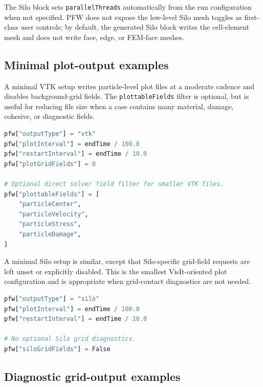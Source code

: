 The Silo block sets \texttt{parallelThreads} automatically from the run configuration when not specified.  PFW does not expose the low-level Silo mesh toggles as first-class user controls; by default, the generated Silo block writes the cell-element mesh and does not write face, edge, or FEM-face meshes.

\subsection{Minimal plot-output examples}
\label{sec:pfw-minimal-output-examples}

A minimal VTK setup writes particle-level plot files at a moderate cadence and disables background-grid fields.  The \texttt{plottableFields} filter is optional, but is useful for reducing file size when a case contains many material, damage, cohesive, or diagnostic fields.

\begin{lstlisting}[language=Python,caption={Minimal VTK/ParaView plot output.}]
pfw["outputType"] = "vtk"
pfw["plotInterval"] = endTime / 100.0
pfw["restartInterval"] = endTime / 10.0
pfw["plotGridFields"] = 0

# Optional direct solver field filter for smaller VTK files.
pfw["plottableFields"] = [
    "particleCenter",
    "particleVelocity",
    "particleStress",
    "particleDamage",
]
\end{lstlisting}

A minimal Silo setup is similar, except that Silo-specific grid-field requests are left unset or explicitly disabled.  This is the smallest VisIt-oriented plot configuration and is appropriate when grid-contact diagnostics are not needed.

\begin{lstlisting}[language=Python,caption={Minimal Silo/VisIt plot output.}]
pfw["outputType"] = "silo"
pfw["plotInterval"] = endTime / 100.0
pfw["restartInterval"] = endTime / 10.0

# No optional Silo grid diagnostics.
pfw["siloGridFields"] = False
\end{lstlisting}

\subsection{Diagnostic grid-output examples}
\label{sec:pfw-diagnostic-output-examples}

